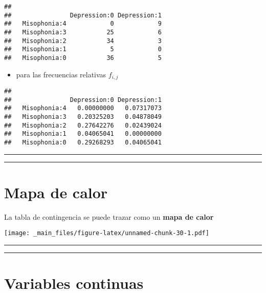 \documentclass[
]{book}
\providecommand{\tightlist}{%
  \setlength{\itemsep}{0pt}\setlength{\parskip}{0pt}}
\begin{document}
\begin{verbatim}
##               
##                Depression:0 Depression:1
##   Misophonia:4            0            9
##   Misophonia:3           25            6
##   Misophonia:2           34            3
##   Misophonia:1            5            0
##   Misophonia:0           36            5
\end{verbatim}

\begin{itemize}
\tightlist
\item
  para las frecuencias relativas \(f_{i,j}\)
\end{itemize}

\begin{verbatim}
##               
##                Depression:0 Depression:1
##   Misophonia:4   0.00000000   0.07317073
##   Misophonia:3   0.20325203   0.04878049
##   Misophonia:2   0.27642276   0.02439024
##   Misophonia:1   0.04065041   0.00000000
##   Misophonia:0   0.29268293   0.04065041
\end{verbatim}

\begin{center}\rule{0.5\linewidth}{0.5pt}\end{center}

\begin{center}\rule{0.5\linewidth}{0.5pt}\end{center}

\hypertarget{mapa-de-calor}{%
\section{Mapa de calor}\label{mapa-de-calor}}

La tabla de contingencia se puede trazar como un \textbf{mapa de calor}

\texttt{[image: \_main\_files/figure-latex/unnamed-chunk-30-1.pdf]}

\begin{center}\rule{0.5\linewidth}{0.5pt}\end{center}

\begin{center}\rule{0.5\linewidth}{0.5pt}\end{center}

\hypertarget{variables-continuas-1}{%
\section{Variables continuas}\label{variables-continuas-1}}
\end{document}
